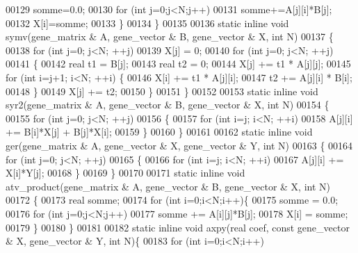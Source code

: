 \begin{DoxyCode}
00129       somme=0.0;
00130       \textcolor{keywordflow}{for} (\textcolor{keywordtype}{int} j=0;j<N;j++)
00131         somme+=A[j][i]*B[j];
00132       X[i]=somme;
00133     \}
00134   \}
00135 
00136   \textcolor{keyword}{static} \textcolor{keyword}{inline} \textcolor{keywordtype}{void} symv(gene\_matrix & A, gene\_vector & B, gene\_vector & X, \textcolor{keywordtype}{int} N)
00137   \{
00138     \textcolor{keywordflow}{for} (\textcolor{keywordtype}{int} j=0; j<N; ++j)
00139       X[j] = 0;
00140     \textcolor{keywordflow}{for} (\textcolor{keywordtype}{int} j=0; j<N; ++j)
00141     \{
00142       real t1 = B[j];
00143       real t2 = 0;
00144       X[j] += t1 * A[j][j];
00145       \textcolor{keywordflow}{for} (\textcolor{keywordtype}{int} i=j+1; i<N; ++i) \{
00146         X[i] += t1 * A[j][i];
00147         t2 += A[j][i] * B[i];
00148       \}
00149       X[j] += t2;
00150     \}
00151   \}
00152   
00153   \textcolor{keyword}{static} \textcolor{keyword}{inline} \textcolor{keywordtype}{void} syr2(gene\_matrix & A, gene\_vector & B, gene\_vector & X, \textcolor{keywordtype}{int} N)
00154   \{
00155     \textcolor{keywordflow}{for} (\textcolor{keywordtype}{int} j=0; j<N; ++j)
00156     \{
00157       \textcolor{keywordflow}{for} (\textcolor{keywordtype}{int} i=j; i<N; ++i)
00158         A[j][i] += B[i]*X[j] + B[j]*X[i];
00159     \}
00160   \}
00161 
00162   \textcolor{keyword}{static} \textcolor{keyword}{inline} \textcolor{keywordtype}{void} ger(gene\_matrix & A, gene\_vector & X, gene\_vector & Y, \textcolor{keywordtype}{int} N)
00163   \{
00164     \textcolor{keywordflow}{for} (\textcolor{keywordtype}{int} j=0; j<N; ++j)
00165     \{
00166       \textcolor{keywordflow}{for} (\textcolor{keywordtype}{int} i=j; i<N; ++i)
00167         A[j][i] += X[i]*Y[j];
00168     \}
00169   \}
00170 
00171   \textcolor{keyword}{static} \textcolor{keyword}{inline} \textcolor{keywordtype}{void} atv\_product(gene\_matrix & A, gene\_vector & B, gene\_vector & X, \textcolor{keywordtype}{int} N)
00172   \{
00173     real somme;
00174     \textcolor{keywordflow}{for} (\textcolor{keywordtype}{int} i=0;i<N;i++)\{
00175       somme = 0.0;
00176       \textcolor{keywordflow}{for} (\textcolor{keywordtype}{int} j=0;j<N;j++)
00177         somme += A[i][j]*B[j];
00178       X[i] = somme;
00179     \}
00180   \}
00181 
00182   \textcolor{keyword}{static} \textcolor{keyword}{inline} \textcolor{keywordtype}{void} axpy(real coef, \textcolor{keyword}{const} gene\_vector & X, gene\_vector & Y, \textcolor{keywordtype}{int} N)\{
00183     \textcolor{keywordflow}{for} (\textcolor{keywordtype}{int} i=0;i<N;i++)

\end{DoxyCode}
